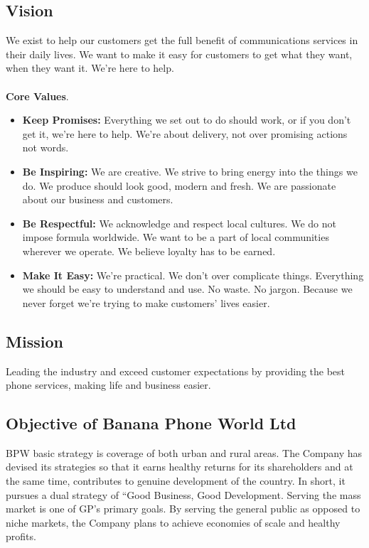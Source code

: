 \newpage
\subsection{Vision}
We exist to help our customers get the full benefit of communications services in their
daily lives. We want to make it easy for customers to get what they want, when they want it.
We're here to help.\\ \\
\normalsize {\bf Core Values}.
\begin{itemize}
\item	\textbf{Keep Promises:} Everything we set out to do should work, or if you don't get it, we’re here to help. We’re about delivery, not over promising actions not words. 
\item	\textbf{Be Inspiring:} We are creative. We strive to bring energy into the things we do. We produce should look good, modern and fresh. We are passionate about our business and customers. 
\item	\textbf{Be Respectful:} We acknowledge and respect local cultures. We do not impose formula worldwide. We want to be a part of local communities wherever we operate. We believe loyalty has to be earned.
\item	\textbf{Make It Easy:} We’re practical. We don't over complicate things. Everything we should be easy to understand and use. No waste. No jargon. Because we never forget we're trying to make customers' lives easier. 
\end{itemize}

\subsection{Mission}
Leading the industry and exceed customer expectations by providing the best phone services,
making life and business easier.

\subsection{Objective of Banana Phone World Ltd }
BPW basic strategy is coverage of both urban and rural areas. The Company has devised its strategies so that it earns healthy returns for its shareholders and at the same time, contributes to genuine development of the country. In short, it pursues a dual strategy of “Good Business, Good Development. Serving the mass market is one of GP's primary goals. By serving the general public as opposed to niche markets, the Company plans to achieve economies of scale and healthy profits.

